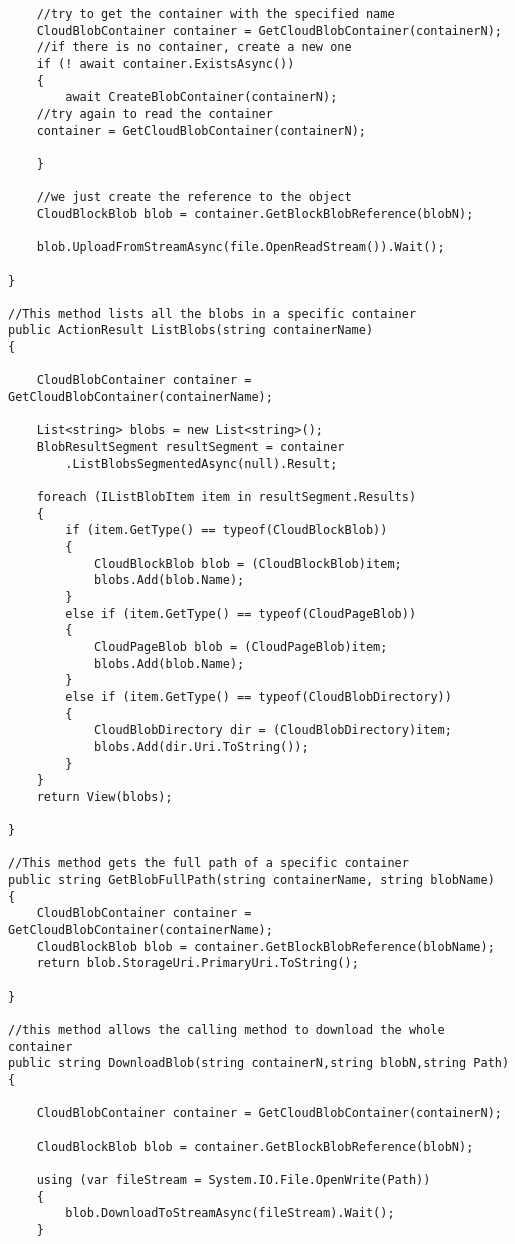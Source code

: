\begin{lstlisting}
	//try to get the container with the specified name
	CloudBlobContainer container = GetCloudBlobContainer(containerN);
	//if there is no container, create a new one
	if (! await container.ExistsAsync())
	{
		await CreateBlobContainer(containerN);
	//try again to read the container
	container = GetCloudBlobContainer(containerN);

	}

	//we just create the reference to the object
	CloudBlockBlob blob = container.GetBlockBlobReference(blobN);

	blob.UploadFromStreamAsync(file.OpenReadStream()).Wait();

}

//This method lists all the blobs in a specific container
public ActionResult ListBlobs(string containerName)
{

	CloudBlobContainer container = GetCloudBlobContainer(containerName);

	List<string> blobs = new List<string>();
	BlobResultSegment resultSegment = container
		.ListBlobsSegmentedAsync(null).Result;

	foreach (IListBlobItem item in resultSegment.Results)
	{
		if (item.GetType() == typeof(CloudBlockBlob))
		{
			CloudBlockBlob blob = (CloudBlockBlob)item;
			blobs.Add(blob.Name);
		}
		else if (item.GetType() == typeof(CloudPageBlob))
		{
			CloudPageBlob blob = (CloudPageBlob)item;
			blobs.Add(blob.Name);
		}
		else if (item.GetType() == typeof(CloudBlobDirectory))
		{
			CloudBlobDirectory dir = (CloudBlobDirectory)item;
			blobs.Add(dir.Uri.ToString());
		}
	}
	return View(blobs);

}

//This method gets the full path of a specific container
public string GetBlobFullPath(string containerName, string blobName)
{
	CloudBlobContainer container = GetCloudBlobContainer(containerName);
	CloudBlockBlob blob = container.GetBlockBlobReference(blobName);
	return blob.StorageUri.PrimaryUri.ToString();

}

//this method allows the calling method to download the whole container
public string DownloadBlob(string containerN,string blobN,string Path)
{

	CloudBlobContainer container = GetCloudBlobContainer(containerN);

	CloudBlockBlob blob = container.GetBlockBlobReference(blobN);

	using (var fileStream = System.IO.File.OpenWrite(Path))
	{
		blob.DownloadToStreamAsync(fileStream).Wait();
	}


\end{lstlisting}
